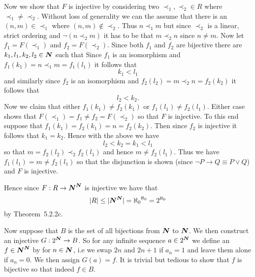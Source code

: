 {{    Now we show that $F$ is injective by considering two $\prec_1, \prec_2 \in R$ where $\prec_1 \neq \prec_2$.
    Without loss of generality we can the assume that there is an $(n,m) \in \prec_1$ where $(n,m) \notin \prec_2$.
    Thus $n \prec_1 m$ but since $\prec_2$ is a linear, strict ordering and $\lnot (n \prec_2 m)$ it has to be that $m \prec_2 n$ since $n \neq m$.
    Now let $f_1 = F(\prec_1)$ and $f_2 = F(\prec_2)$.
    Since both $f_1$ and $f_2$ are bijective there are $k_1,l_1,k_2,l_2 \in {\boldsymbol{N}}$ such that
    Since $f_1$ is an isomorphism and $f_1(k_1) = n \prec_1 m = f_1(l_1)$ it follows that
    $$
      k_1 < l_1
    $$
    and similarly since $f_2$ is an isomorphism and $f_2(l_2) = m \prec_2 n = f_2(k_2)$ it follows that
    $$
      l_2 < k_2.
    $$
    Now we claim that either $f_1(k_1) \neq f_2(k_1)$ or $f_1(l_1) \neq f_2(l_1)$.
    Either case shows that $F(\prec_1) = f_1 \neq f_2 = F(\prec_2)$ so that $F$ is injective.
    To this end suppose that $f_1(k_1) = f_2(k_1) = n = f_2(k_2)$.
    Then since $f_2$ is injective it follows that $k_1 = k_2$.
    Hence with the above we have
    $$
      l_2 < k_2 = k_1 < l_1
    $$
    so that $m = f_2(l_2) \prec_2 f_2(l_1)$ and hence $m \neq f_2(l_1)$.
    Thus we have $f_1(l_1) = m \neq f_2(l_1)$ so that the disjunction is shown (since $\lnot P \to Q \equiv P \lor Q$) and $F$ is injective.

    Hence since $F: R \to {\boldsymbol{N}}^{\boldsymbol{N}}$ is injective we have that
    $$
      |R| \leq |{\boldsymbol{N}}^{\boldsymbol{N}}| = {\aleph_0}^{\aleph_0} = {2^{\aleph_0}}
    $$
    by Theorem~5.2.2c.

    Now suppose that $B$ is the set of all bijections from ${\boldsymbol{N}}$ to ${\boldsymbol{N}}$.
    We then construct an injective $G: 2^{\boldsymbol{N}} \to B$.
    So for any infinite sequence $a \in 2^{\boldsymbol{N}}$ we define an $f \in {\boldsymbol{N}}^{\boldsymbol{N}}$ by
    for $n \in {\boldsymbol{N}}$, i.e we swap $2n$ and $2n+1$ if $a_n = 1$ and leave them alone if $a_n = 0$.
    We then assign $G(a) = f$.
    It is trivial but tedious to show that $f$ is bijective so that indeed $f \in B$.

}}

